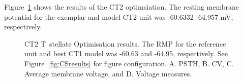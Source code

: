 

Figure~\ref{fig:CT2results} shows the results of the CT2 optimsiation.  The
resting membrane potential for the exemplar and model CT2 unit was -60.6332
-64.957 mV, respectively.


\begin{figure}[htb]
  \centering
% 
  \caption[CT2 T~stellate Optimisation results]{CT2 T~stellate Optimisation
    results.  The RMP for the reference unit and best CT1 model was -60.63 and
   -64.95, respectively.  See Figure~\ref{fig:CSresults} for figure
    configuration.  A. PSTH, B. CV, C. Average membrane voltage, and D. Voltage
    measures.}
  \label{fig:CT2results}
\end{figure}



